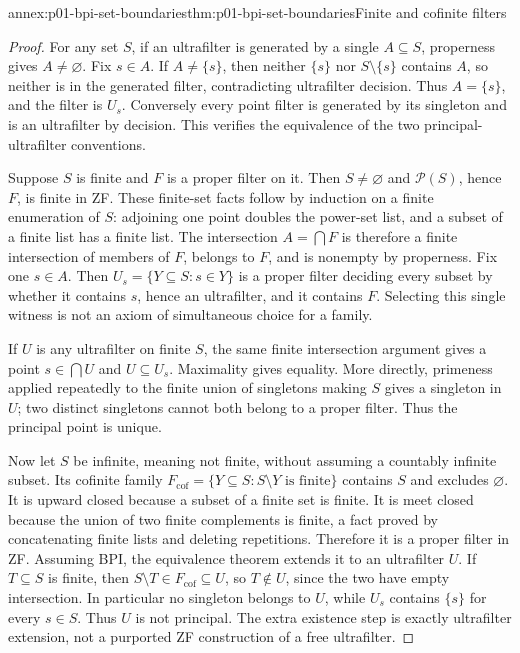 \begin{annexitem}{annex:p01-bpi-set-boundaries}{thm:p01-bpi-set-boundaries}{Finite and cofinite filters}
\begin{proof}
For any set \(S\), if an ultrafilter is generated by a single
\(A\subseteq S\), properness gives \(A\ne\varnothing\). Fix
\(s\in A\). If \(A\ne\{s\}\), then neither \(\{s\}\) nor
\(S\setminus\{s\}\) contains \(A\), so neither is in the
generated filter, contradicting ultrafilter decision. Thus \(A=\{s\}\),
and the filter is \(U_s\). Conversely every point filter is generated
by its singleton and is an ultrafilter by decision. This verifies the
equivalence of the two principal-ultrafilter conventions.

Suppose \(S\) is finite and \(F\) is a proper filter on it.
Then \(S\ne\varnothing\) and \(\mathcal P(S)\), hence \(F\),
is finite in ZF. These finite-set facts follow by induction on a finite
enumeration of \(S\): adjoining one point doubles the power-set list,
and a subset of a finite list has a finite list. The intersection
\(A=\bigcap F\) is therefore a finite intersection of members of
\(F\), belongs to \(F\), and is nonempty by properness. Fix one
\(s\in A\). Then \(U_s=\{Y\subseteq S:s\in Y\}\) is a proper
filter deciding every subset by whether it contains \(s\), hence an
ultrafilter, and it contains \(F\). Selecting this single witness is
not an axiom of simultaneous choice for a family.

If \(U\) is any ultrafilter on finite \(S\), the same finite
intersection argument gives a point \(s\in\bigcap U\) and
\(U\subseteq U_s\). Maximality gives equality. More directly,
primeness applied repeatedly to the finite union of singletons making
\(S\) gives a singleton in \(U\); two distinct singletons cannot
both belong to a proper filter. Thus the principal point is unique.

Now let \(S\) be infinite, meaning not finite, without assuming a
countably infinite subset. Its cofinite family
\(F_{\mathrm{cof}}=\{Y\subseteq S:S\setminus Y\text{ is finite}\}\)
contains \(S\) and excludes \(\varnothing\). It is upward closed
because a subset of a finite set is finite. It is meet closed because
the union of two finite complements is finite, a fact proved by
concatenating finite lists and deleting repetitions. Therefore it is
a proper filter in ZF. Assuming BPI, the equivalence theorem extends it
to an ultrafilter \(U\). If \(T\subseteq S\) is finite, then
\(S\setminus T\in F_{\mathrm{cof}}\subseteq U\), so
\(T\notin U\), since the two have empty intersection. In particular
no singleton belongs to \(U\), while \(U_s\) contains \(\{s\}\)
for every \(s\in S\). Thus \(U\) is not principal. The extra
existence step is exactly ultrafilter extension, not a purported ZF
construction of a free ultrafilter.
\end{proof}
\end{annexitem}
